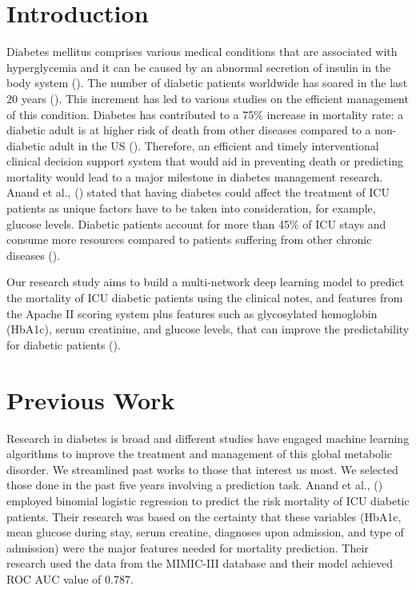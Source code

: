 \documentclass{sigkddExp}
\begin{document}
\section{Introduction}
Diabetes mellitus comprises various medical conditions that are associated with hyperglycemia and it can 
be caused by an abnormal secretion of insulin in the body system (\cite{egan}). 
The number of diabetic patients worldwide has soared in the last 20 years (\cite{zimmet}). 
This increment has led to various studies on the efficient management of this condition. 
Diabetes has contributed to a 75\% increase in mortality rate:
a diabetic adult is at higher risk of death from other diseases compared to a 
non-diabetic adult in the US (\cite{gregg}). Therefore,
an efficient and timely interventional clinical decision support system that 
would aid in preventing death or predicting mortality would 
lead to a major milestone in diabetes management research. Anand et al., (\cite{anand}) stated 
that having diabetes could affect the treatment 
of ICU patients as unique factors have to be taken into consideration, for example,
glucose levels. Diabetic patients account for more than 45\% of ICU stays and consume 
more resources compared to patients suffering from 
other chronic diseases (\cite{anand}). 
 
Our research study aims to build a multi-network deep learning model to predict the mortality 
of ICU diabetic patients using the clinical notes,
and features from the Apache II scoring system plus features such as glycosylated hemoglobin (HbA1c),
serum creatinine, and glucose levels, that can improve the predictability for diabetic patients (\cite{anand}).

\section{Previous Work}
Research in diabetes is broad and different studies have engaged machine learning algorithms to improve 
the treatment and management of this global metabolic disorder. We streamlined past works to those that 
interest us most.  We selected
those done in the past five years involving a prediction task.
Anand et al., (\cite{anand}) employed binomial logistic regression to predict the risk mortality of ICU diabetic patients.  
Their research was based on the certainty that these variables (HbA1c, mean glucose during stay, serum creatine, 
diagnoses upon admission, and type of admission) were the major features needed for mortality prediction. 
Their research used the data from the MIMIC-III database and their model achieved ROC AUC value of 0.787.
\end{document}
